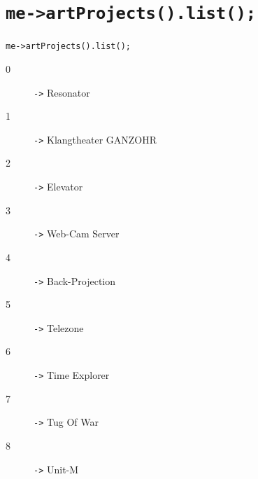 ﻿\section{\tt{me->artProjects().list();}}

\begin{frame}{\tt{me->artProjects().list();}}
  \begin{description}
    \item[0] {\texttt{->}} Resonator
    \item[1] {\texttt{->}} Klangtheater GANZOHR
    \item[2] {\texttt{->}} Elevator
    \item[3] {\texttt{->}} Web-Cam Server
    \item[4] {\texttt{->}} Back-Projection
    \item[5] {\texttt{->}} Telezone
    \item[6] {\texttt{->}} Time Explorer
    \item[7] {\texttt{->}} Tug Of War
    \item[8] {\texttt{->}} Unit-M
  \end{description}
\end{frame}

